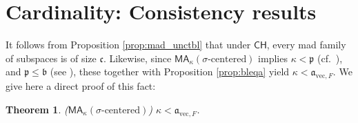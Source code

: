 \documentclass[11pt]{amsart}
\newcommand{\LM}{\mathcal{M}}
\newcommand{\LA}{\mathcal{A}}
\newcommand{\LB}{\mathcal{B}}
\newcommand{\p}{\mathfrak{p}}
\renewcommand{\b}{\mathfrak{b}}
\renewcommand{\a}{\mathfrak{a}}
\renewcommand{\c}{\mathfrak{c}}
\newtheorem{thm}{Theorem}[section]
\newtheorem{lemma}[thm]{Lemma}
\newtheorem{cor}[thm]{Corollary}
\theoremstyle{definition}
\theoremstyle{remark}
\newcommand{\supp}{\mathrm{supp}}
\newcommand{\CH}{\mathsf{CH}}
\newcommand{\MA}{\mathsf{MA}}
\renewcommand{\1}{\mathbf{1}}
\newcommand{\cc}{\mathfrak{c}}
\newcommand{\FU}{\mathrm{FU}}
\begin{document}
%
%
%
%
%




\section{Cardinality: Consistency results}\label{sec:card_cons}

It follows from Proposition \ref{prop:mad_unctbl} that under $\CH$, every mad family of subspaces is of size $\cc$. Likewise, since $\MA_\kappa(\sigma\text{-centered})$ implies $\kappa<\p$ (cf.~\cite{MR643555}), and $\p\leq\b$ (see \cite{MR776622}), these together with Proposition \ref{prop:bleqa} yield $\kappa<\a_{\mathrm{vec},F}$. We give here a direct proof of this fact:


\begin{thm}\label{thm:MA_a_large}
	\textup{($\MA_\kappa(\sigma\text{-centered})$)} $\kappa<\a_{\mathrm{vec},F}$.	
\end{thm}
\end{document}
